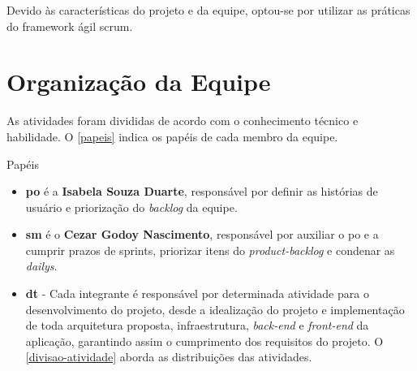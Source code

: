   Devido às características do projeto e da equipe, optou-se por utilizar as práticas do framework ágil \gls{scrum}. 

\section{Organização da Equipe}
As atividades foram divididas de acordo com o conhecimento técnico e habilidade. O \autoref{papeis} indica os papéis de cada membro da equipe.

\begin{quadro}[H]
	\centering\footnotesize
    \ABNTEXfontereduzida
    \caption{Papéis}
    \label{papeis}
\end{quadro}

\begin{itemize}
    \item \textbf{\ac{po}} é a \textbf{Isabela Souza Duarte}, responsável por definir as \gls{histórias de usuário} e priorização do \emph{\gls{backlog}} da equipe.
    \item \textbf{\ac{sm}} é o \textbf{Cezar Godoy Nascimento}, responsável por auxiliar o \ac{po} e a cumprir prazos de \gls{sprints}, priorizar itens do \emph{\gls{product-backlog}} e condenar as \emph{\gls{dailys}}.
    \item \textbf{\ac{dt}} - Cada integrante é responsável por determinada atividade para o desenvolvimento do projeto, desde a idealização do projeto e implementação de toda arquitetura proposta, infraestrutura, \emph{\gls{back-end}} e \emph{\gls{front-end}} da aplicação, garantindo assim o cumprimento dos requisitos do projeto. 
    O \autoref{divisao-atividade} aborda as distribuições das atividades.
\end{itemize}


